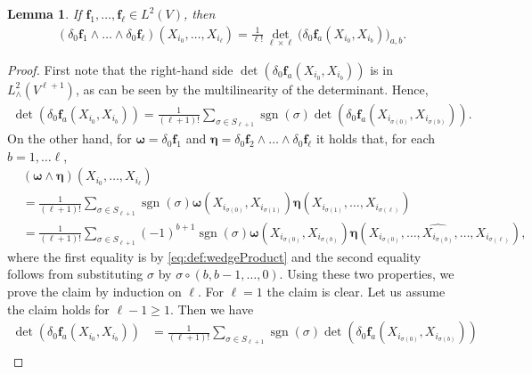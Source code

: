 \documentclass[10pt]{article}
\theoremstyle{plain}
\newtheorem{lemma}{Lemma}
\theoremstyle{definition}
\theoremstyle{remark}
\begin{document}
    \begin{lemma}\label{lemma:derivative:empirical:l:form:det}
        If $\mathbf{f}_1,\dots,\mathbf{f}_\ell\in L^2(V)$, then 
        \begin{align*}
            (\delta_0\mathbf{f}_1\wedge\dots\wedge \delta_0\mathbf{f}_\ell)(X_{i_{0}},\dots, X_{i_{\ell}})=\frac{1}{\ell!}\det_{\ell\times\ell}\big( \delta_0 \mathbf{f}_a(X_{i_0},X_{i_b})\big)_{a,b}.
        \end{align*}
    \end{lemma}

    \begin{proof}
        First note that the right-hand side $\det( \delta_0 \mathbf{f}_a(X_{i_0},X_{i_b}))$ is in $L^2_\wedge(V^{\ell+1})$, as can be seen by the multilinearity of the determinant. Hence, 
        \begin{align}\label{eq:D:alternating}
            \det( \delta_0 \mathbf{f}_a(X_{i_0},X_{i_b}))=\frac{1}{(\ell+1)!}\sum_{\sigma\in S_{\ell+1}}\operatorname{sgn}(\sigma)\det( \delta_0 \mathbf{f}_{a}(X_{i_{\sigma(0)}},X_{i_{\sigma(b)}})).
        \end{align}
        On the other hand, for $\boldsymbol{\omega}=\delta_0\mathbf{f}_1$ and $\boldsymbol{\eta}=\delta_0\mathbf{f}_2\wedge\dots\wedge \delta_0\mathbf{f}_\ell$ it holds that, for each $b=1,\dots\ell$,
        \begin{align}\label{eq:wedge:product:2:l-1}
        &(\boldsymbol{\omega}\wedge \boldsymbol{\eta})(X_{i_0},\dots,X_{i_\ell})\\
        &=\frac{1}{(\ell+1)!}\sum_{\sigma\in S_{\ell+1}}\operatorname{sgn}(\sigma)\boldsymbol{\omega}(X_{i_{\sigma(0)}}, X_{i_{\sigma(1)}})\boldsymbol{\eta}(X_{i_{\sigma(1)}},\dots, X_{i_{\sigma(\ell)}})\nonumber\\
        &=\frac{1}{(\ell+1)!}\sum_{\sigma\in S_{\ell+1}}(-1)^{b+1}\operatorname{sgn}(\sigma)\boldsymbol{\omega}(X_{i_{\sigma(0)}}, X_{i_{\sigma(b)}})\boldsymbol{\eta}(X_{i_{\sigma(0)}},\dots,\widehat{X_{i_{\sigma(b)}}},\dots,X_{i_{\sigma(\ell)}})\nonumber,
        \end{align}
        where the first equality is by \eqref{eq:def:wedgeProduct} and the second equality follows from substituting $\sigma$ by $\sigma\circ (b,b-1,\dots,0)$. Using these two properties, we prove the claim by induction on $\ell$. For $\ell =1$ the claim is clear. Let us assume the claim holds for $\ell-1\geq 1$. Then we have
        \begin{align*}
            \det( \delta_0 \mathbf{f}_a(X_{i_0},X_{i_b})) &=\frac{1}{(\ell+1)!}\sum_{\sigma\in S_{\ell+1}}\operatorname{sgn}(\sigma)\det( \delta_0 \mathbf{f}_{a}(X_{i_{\sigma(0)}},X_{i_{\sigma(b)}}))\\

\end{align*}
\end{proof}
\end{document}
